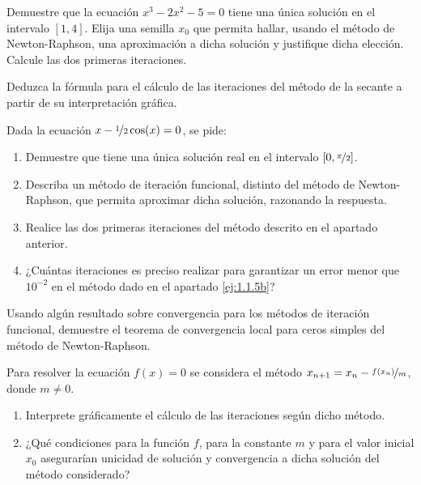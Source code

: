 \begin{ejercicio}\label{ej:1.1.3}
    Demuestre que la ecuación $x^3 - 2x^2 - 5 = 0$ tiene una única solución en el intervalo $[1, 4]$. Elija una semilla $x_0$ que permita hallar, usando el método de Newton-Raphson, una aproximación a dicha solución y justifique dicha elección. Calcule las dos primeras iteraciones.
\end{ejercicio}


\begin{ejercicio}\label{ej:1.1.4}
    Deduzca la fórmula para el cálculo de las iteraciones del método de la secante a partir de su interpretación gráfica.
\end{ejercicio}


\begin{ejercicio}\label{ej:1.1.5}
    Dada la ecuación $x - \nicefrac{1}{2}\cos(x) = 0$, se pide:
    \begin{enumerate}
        \item Demuestre que tiene una única solución real en el intervalo $\left[0,\nicefrac{\pi}{2}\right]$.
        \item\label{ej:1.1.5b}
        Describa un método de iteración funcional, distinto del método de Newton-Raphson, que permita aproximar dicha solución, razonando la respuesta.
        \item Realice las dos primeras iteraciones del método descrito en el apartado anterior.
        \item ¿Cuántas iteraciones es preciso realizar para garantizar un error menor que $10^{-2}$ en el método dado en el apartado \ref{ej:1.1.5b}?
    \end{enumerate}
\end{ejercicio}

\begin{ejercicio}\label{ej:1.1.6}
    Usando algún resultado sobre convergencia para los métodos de iteración funcional, demuestre el teorema de convergencia local para ceros simples del método de Newton-Raphson.
\end{ejercicio}

\begin{ejercicio}\label{ej:1.1.7}
    Para resolver la ecuación $f(x) = 0$ se considera el método $x_{n+1} = x_n - \nicefrac{f(x_n)}{m}$, donde $m \neq 0$.
    \begin{enumerate}
        \item Interprete gráficamente el cálculo de las iteraciones según dicho método.
        \item ¿Qué condiciones para la función $f$, para la constante $m$ y para el valor inicial $x_0$ asegurarían unicidad de solución y convergencia a dicha solución del método considerado?
    \end{enumerate}
\end{ejercicio}


